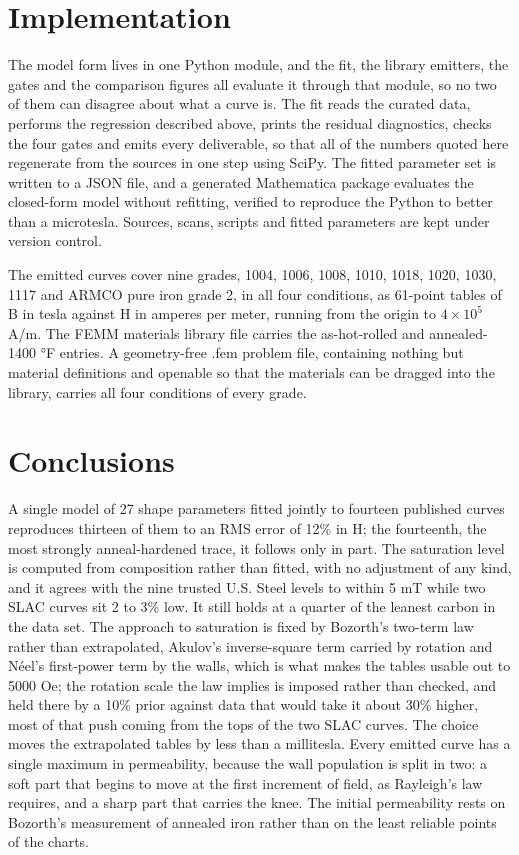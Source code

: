 \documentclass[
  11pt,
]{article}
\begin{document}
\section{Implementation}\label{implementation}

The model form lives in one Python module, and the fit, the library emitters, the gates and the comparison figures all evaluate it through that module, so no two of them can disagree about what a curve is. The fit reads the curated data, performs the regression described above, prints the residual diagnostics, checks the four gates and emits every deliverable, so that all of the numbers quoted here regenerate from the sources in one step using SciPy. The fitted parameter set is written to a JSON file, and a generated Mathematica package evaluates the closed-form model without refitting, verified to reproduce the Python to better than a microtesla. Sources, scans, scripts and fitted parameters are kept under version control.

The emitted curves cover nine grades, 1004, 1006, 1008, 1010, 1018, 1020, 1030, 1117 and ARMCO pure iron grade 2, in all four conditions, as 61-point tables of B in tesla against H in amperes per meter, running from the origin to \(4\times10^{5}\) A/m. The FEMM materials library file carries the as-hot-rolled and annealed-1400 °F entries. A geometry-free .fem problem file, containing nothing but material definitions and openable so that the materials can be dragged into the library, carries all four conditions of every grade.

\section{Conclusions}\label{conclusions}

A single model of 27 shape parameters fitted jointly to fourteen published curves reproduces thirteen of them to an RMS error of 12\% in H; the fourteenth, the most strongly anneal-hardened trace, it follows only in part. The saturation level is computed from composition rather than fitted, with no adjustment of any kind, and it agrees with the nine trusted U.S. Steel levels to within 5 mT while two SLAC curves sit 2 to 3\% low. It still holds at a quarter of the leanest carbon in the data set. The approach to saturation is fixed by Bozorth's two-term law rather than extrapolated, Akulov's inverse-square term carried by rotation and Néel's first-power term by the walls, which is what makes the tables usable out to 5000 Oe; the rotation scale the law implies is imposed rather than checked, and held there by a 10\% prior against data that would take it about 30\% higher, most of that push coming from the tops of the two SLAC curves. The choice moves the extrapolated tables by less than a millitesla. Every emitted curve has a single maximum in permeability, because the wall population is split in two: a soft part that begins to move at the first increment of field, as Rayleigh's law requires, and a sharp part that carries the knee. The initial permeability rests on Bozorth's measurement of annealed iron rather than on the least reliable points of the charts.
\end{document}
